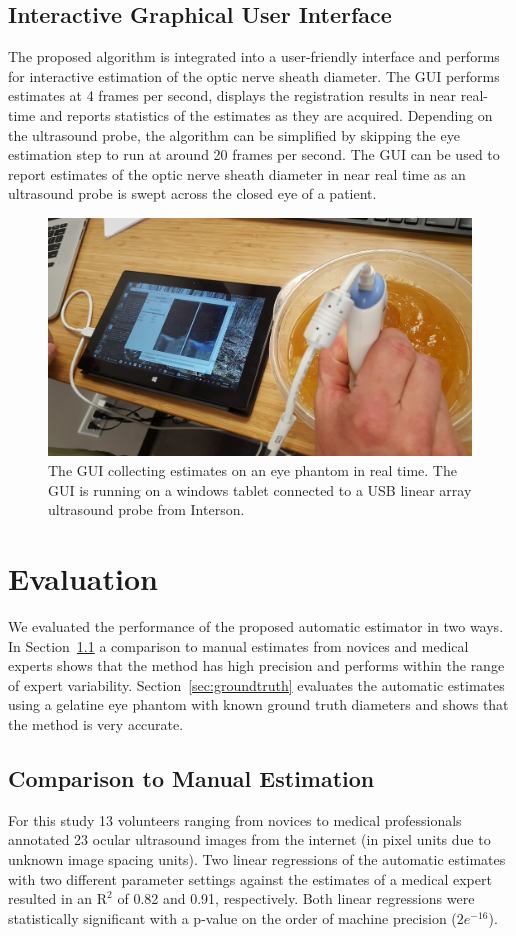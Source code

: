 \documentclass{llncs}
\begin{document}
\subsection{Interactive Graphical User Interface}
\label{sec:gui}
The proposed algorithm is integrated into a user-friendly interface and
performs for interactive estimation of the optic nerve sheath diameter. The GUI
performs estimates at 4 frames per second, displays the registration results in
near real-time and reports statistics of the estimates as they are acquired.
Depending on the ultrasound probe, the algorithm can be simplified by skipping
the eye estimation step to run at around 20 frames per second. The GUI can be
used to report estimates of the optic nerve sheath diameter in near real time
as an ultrasound probe is swept across the closed eye of a patient. 
\begin{figure}
\centering
\includegraphics[width=0.65\linewidth]{gui.jpg} 
\caption{
\label{fig:gui}
The GUI collecting estimates on an eye phantom in real time. The GUI is running
on a windows tablet connected to a USB linear array ultrasound probe from
Interson.}
\end{figure}


\section{Evaluation}
We evaluated the performance of the proposed automatic estimator in two ways.
In Section~\ref{sec:manual} a comparison to manual estimates from novices and
medical experts shows that the method has high precision and performs within the
range of expert variability. Section~\ref{sec:groundtruth} evaluates the
automatic estimates using a gelatine eye phantom with known ground truth
diameters and shows that the method is very accurate. 

\subsection{Comparison to Manual Estimation}
\label{sec:manual}
For this study 13 volunteers ranging from novices to medical professionals annotated
23 ocular ultrasound images from the internet (in pixel units due to unknown
image spacing units).  Two linear regressions of the automatic estimates with
two different parameter settings against the estimates of a medical expert
resulted in an $\mathrm{R}^2$ of 0.82 and 0.91, respectively. Both linear
regressions were statistically significant with a p-value on the order of
machine precision ($2e^{-16}$).
\end{document}
